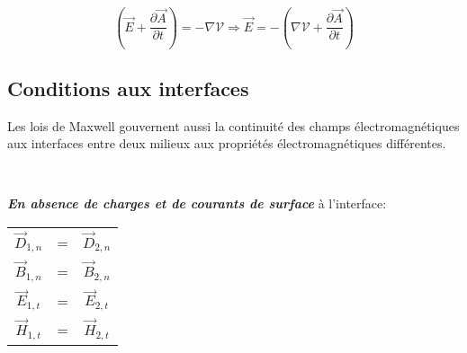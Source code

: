 \[(\vec{E} + \frac{\partial \vec{A}}{\partial t}) = - \nabla \mathcal{V} \Rightarrow \vec{E} = - (\nabla \mathcal{V} + \frac{\partial \vec{A}}{\partial t}) \]
 
 \subsection{Conditions aux interfaces}
 
 Les lois de Maxwell gouvernent aussi la continuité des champs électromagnétiques aux interfaces entre deux milieux aux propriétés électromagnétiques différentes.
 
 \begin{marginfigure}[-10cm]\\
 	\normalsize 
 	\label{interface1}
 	\caption{\textit{\textbf{En absence de charges et de courants de surface}} à l'interface: }
	\begin{center}
	\begin{tabular}{|ccc|}
		\hline
		$\vec{D}_{1,n} $ & = & $\vec{D}_{2,n} $ \\
		$\vec{B}_{1,n} $ & = & $\vec{B}_{2,n} $ \\
		$\vec{E}_{1,t} $ & = & $\vec{E}_{2,t} $ \\
		$\vec{H}_{1,t} $ & = & $\vec{H}_{2,t} $ \\
		\hline
	\end{tabular}
	
	
	
	
	\end{center}

 \end{marginfigure}
 
